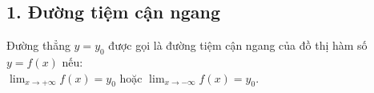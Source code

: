 \documentclass[12pt,a4paper]{extarticle}
\begin{document}
\makeheadbox[headerright={Chương 1},chude={Bài 3},tieude={Các đường tiệm cận},dinhdang={Giải tích},lop={12 },gv={Nguyễn Lê Minh Ngọc}]

\vspace{2em}
\subsection*{1. Đường tiệm cận ngang}
\begin{doublelinebox}
    Đường thẳng $y = y_0$ được gọi là đường tiệm cận ngang của đồ thị hàm số $y = f(x)$ nếu:\\
    $\displaystyle\lim_{x \to +\infty} f(x) = y_0$ hoặc $\displaystyle\lim_{x \to -\infty} f(x) = y_0$.
\end{doublelinebox}
\end{document}
